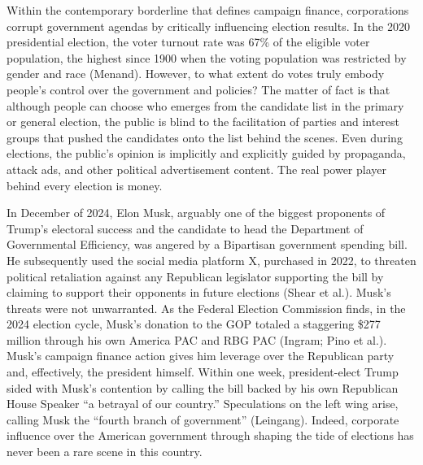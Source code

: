 Within the contemporary borderline that defines campaign finance, corporations corrupt government agendas by critically influencing election results. In the 2020 presidential election, the voter turnout rate was 67\% of the eligible voter population, the highest since 1900 when the voting population was restricted by gender and race (Menand). However, to what extent do votes truly embody people’s control over the government and policies? The matter of fact is that although people can choose who emerges from the candidate list in the primary or general election, the public is blind to the facilitation of parties and interest groups that pushed the candidates onto the list behind the scenes. Even during elections, the public’s opinion is implicitly and explicitly guided by propaganda, attack ads, and other political advertisement content. The real power player behind every election is money. 

In December of 2024, Elon Musk, arguably one of the biggest proponents of Trump’s electoral success and the candidate to head the Department of Governmental Efficiency, was angered by a Bipartisan government spending bill. He subsequently used the social media platform X, purchased in 2022, to threaten political retaliation against any Republican legislator supporting the bill by claiming to support their opponents in future elections (Shear et al.). Musk’s threats were not unwarranted. As the Federal Election Commission finds, in the 2024 election cycle, Musk’s donation to the GOP totaled a staggering \$277 million through his own America PAC and RBG PAC (Ingram; Pino et al.). Musk’s campaign finance action gives him leverage over the Republican party and, effectively, the president himself. Within one week, president-elect Trump sided with Musk’s contention by calling the bill backed by his own Republican House Speaker “a betrayal of our country.” Speculations on the left wing arise, calling Musk the “fourth branch of government” (Leingang). Indeed, corporate influence over the American government through shaping the tide of elections has never been a rare scene in this country. 

